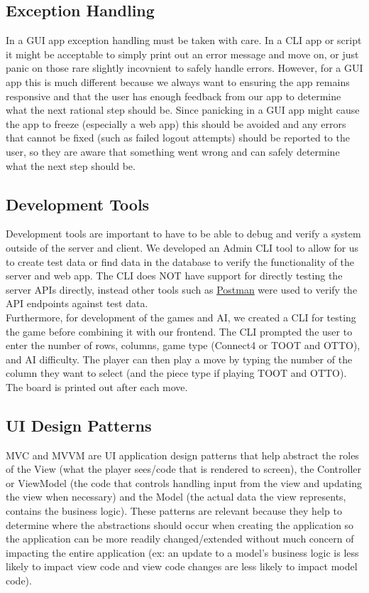 \documentclass{article}
\begin{document}
\subsection{Exception Handling}

In a GUI app exception handling must be taken with care.
In a CLI app or script it might be acceptable to simply print out an error message and move on, or just panic on those rare slightly incovnient to safely handle errors.
However, for a GUI app this is much different because we always want to ensuring the app remains responsive and that the user has enough feedback from our app to determine what the next rational step should be.
Since panicking in a GUI app might cause the app to freeze (especially a web app) this should be avoided and any errors that cannot be fixed (such as failed logout attempts) should be reported to the user, so they are aware that something went wrong and can safely determine what the next step should be. 

\subsection{Development Tools}

Development tools are important to have to be able to debug and verify a system outside of the server and client.  We developed an Admin CLI tool to allow for us to create test data or find data in the database to verify the functionality of the server and web app.
The CLI does NOT have support for directly testing the server APIs directly, instead other tools such as \href{https://www.postman.com}{Postman} were used to verify the API endpoints against test data. \\

Furthermore, for development of the games and AI, we created a CLI for testing the game before combining it with our frontend. The CLI prompted the user to enter the number of rows, columns, game type (Connect4 or TOOT and OTTO), and AI difficulty. The player can then play a move by typing the number of the column they want to select (and the piece type if playing TOOT and OTTO). The board is printed out after each move.

\subsection{UI Design Patterns}

MVC and MVVM are UI application design patterns that help abstract the roles of the View (what the player sees/code that is rendered to screen), the Controller or ViewModel (the code that controls handling input from the view and updating the view when necessary) and the Model (the actual data the view represents, contains the business logic).
These patterns are relevant because they help to determine where the abstractions should occur when creating the application so the application can be more readily changed/extended without much concern of impacting the entire application (ex: an update to a model's business logic is less likely to impact view code and view code changes are less likely to impact model code).
\end{document}
